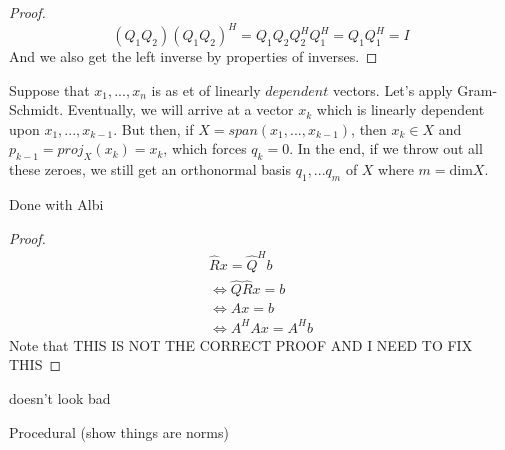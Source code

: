\documentclass[12pt]{article}
\newenvironment{problem}[2][Problem]{\begin{trivlist}
\item[\hskip \labelsep {\bfseries #1}\hskip \labelsep {\bfseries #2.}]}{\end{trivlist}}
\theoremstyle{definition}
\theoremstyle{definition}
\theoremstyle{definition}
\theoremstyle{definition}
\begin{document}
\begin{problem}{3.10}
\begin{itemize}
\begin{proof}
$$
(Q_1Q_2)(Q_1Q_2)^H = Q_1Q_2Q_2^HQ_1^H = Q_1Q_1^H = I
$$
And we also get the left inverse by properties of inverses.
\end{proof}
\end{itemize}
\end{problem}
\begin{problem}{3.11}
Suppose that $x_1, ... , x_n$ is as et of linearly $\textit{dependent}$ vectors. Let's apply Gram-Schmidt. Eventually, we will arrive at a vector $x_k$ which is linearly dependent upon $x_1, ..., x_{k-1}$. But then, if $X = span(x_1, ..., x_{k-1}) $, then $x_k \in X$ and $p_{k-1} = proj_X(x_k) = x_k$, which forces $q_k = 0$. In the end, if we throw out all these zeroes, we still get an orthonormal basis $q_1, ... q_m$ of $X$ where $m = \text{dim} X$. 
\end{problem}


\begin{problem}{3.16} Done with Albi
\end{problem}

\begin{problem}{3.17} \begin{proof}
\begin{align*}
\hat{R}x = \hat{Q}^Hb \\
\iff \hat{Q} \hat{R} x = b \\
\iff Ax = b \\
\iff A^H Ax = A^H b
\end{align*}
Note that THIS IS NOT THE CORRECT PROOF AND I NEED TO FIX THIS
\end{proof}
\end{problem}

\begin{problem}{3.23}doesn't look bad
\end{problem}

\begin{problem}{3.24}Procedural (show things are norms)
\end{problem}
\end{document}
